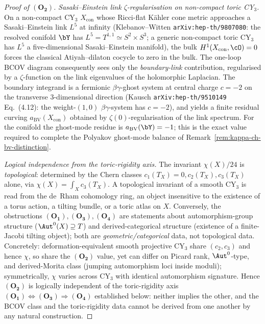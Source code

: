 \begin{proof}[Proof of $(\mathbf{O_2})$]
\emph{Sasaki--Einstein link $\zeta$-regularisation on non-compact
toric CY$_3$.} On a non-compact CY$_3$ $X_{\mathrm{con}}$ whose
Ricci-flat Kähler cone metric approaches a Sasaki--Einstein link
$L^5$ at infinity (Klebanov--Witten
\texttt{arXiv:hep-th/9807080}: the resolved conifold $\bY$ has
$L^5=T^{1,1}\simeq S^2\times S^3$; a generic non-compact toric
CY$_3$ has $L^5$ a five-dimensional Sasaki--Einstein manifold), the
bulk $H^1(X_{\mathrm{con}},\cO)=0$ forces the classical
Atiyah--dilaton cocycle to zero in the bulk. The one-loop BCOV
diagram consequently sees only the \emph{boundary-link}
contribution, regularised by a $\zeta$-function on the link
eigenvalues of the holomorphic Laplacian. The boundary integrand
is a fermionic $\beta\gamma$-ghost system at central charge $c=-2$
on the transverse $3$-dimensional direction (Kausch
\texttt{arXiv:hep-th/9510149} Eq.~(4.12): the weight-$(1,0)$
$\beta\gamma$-system has $c=-2$), and yields a finite residual
curving $a_{\mathrm{BV}}(X_{\mathrm{con}})$ obtained by
$\zeta(0)$-regularisation of the link spectrum. For the conifold
the ghost-mode residue is $a_{\mathrm{BV}}(\bY)=-1$; this
is the exact value required to complete the Polyakov ghost-mode
balance of Remark~\ref{rem:kappa-ch-bv-distinction}.

\emph{Logical independence from the toric-rigidity axis.}
The invariant $\chi(X)/24$ is \emph{topological}: determined by the
Chern classes $c_1(T_X) = 0, c_2(T_X), c_3(T_X)$ alone, via
$\chi(X) = \int_X c_3(T_X)$. A topological invariant of a smooth
CY$_3$ is read from the de~Rham cohomology ring, an object
insensitive to the existence of a torus action, a tilting bundle, or
a toric atlas on $X$. Conversely, the obstructions $(\mathbf{O_1}),
(\mathbf{O_3}), (\mathbf{O_4})$ are statements about
automorphism-group structure ($\Aut^0(X) \supseteq T$) and
derived-categorical structure (existence of a finite-Jacobi tilting
object); both are \emph{geometric/categorical} data, not
topological data. Concretely: deformation-equivalent smooth projective
CY$_3$ share $(c_2, c_3)$ and hence $\chi$, so share the
$(\mathbf{O_2})$ value, yet can differ on Picard rank, $\Aut^0$-type,
and derived-Morita class (jumping automorphism loci inside moduli);
symmetrically, $\chi$ varies across CY$_3$ with identical
automorphism signature. Hence $(\mathbf{O_2})$ is logically
independent of the toric-rigidity axis $(\mathbf{O_1}) \Leftrightarrow
(\mathbf{O_3}) \Rightarrow (\mathbf{O_4})$ established below: neither
implies the other, and the BCOV class and the toric-rigidity data
cannot be derived from one another by any natural construction.
\end{proof}

